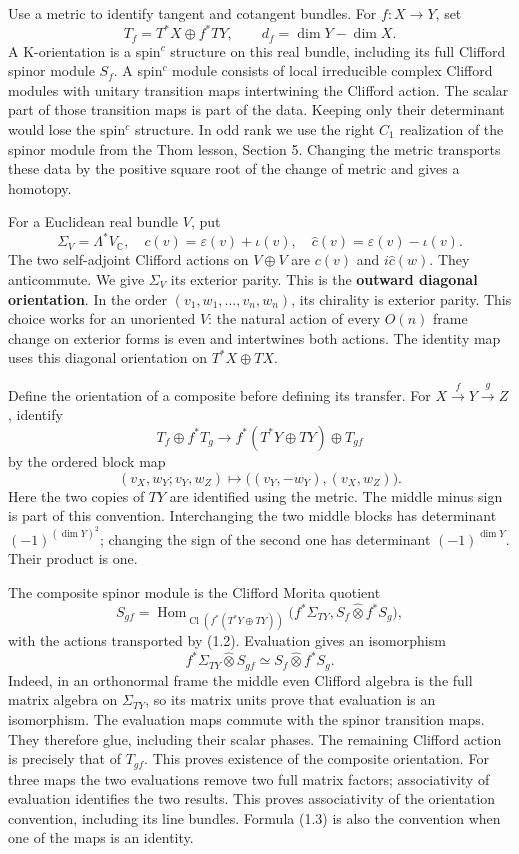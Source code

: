 \documentclass[
  11pt,
]{article}
\begin{document}
Use a metric to identify tangent and cotangent bundles. For
\(f:X\to Y\), set \[
 T_f=T^*X\oplus f^*TY,\qquad d_f=\dim Y-\dim X.
 \tag{1.1}
\] A K-orientation is a spin\(^{c}\) structure on this real bundle,
including its full Clifford spinor module \(S_f\). A spin\(^{c}\) module
consists of local irreducible complex Clifford modules with unitary
transition maps intertwining the Clifford action. The scalar part of
those transition maps is part of the data. Keeping only their
determinant would lose the spin\(^{c}\) structure. In odd rank we use
the right \(C_1\) realization of the spinor module from the Thom lesson,
Section 5. Changing the metric transports these data by the positive
square root of the change of metric and gives a homotopy.

For a Euclidean real bundle \(V\), put \[
 \Sigma_V=\Lambda^*V_{\mathbb C},\quad
 c(v)=\varepsilon(v)+\iota(v),\quad
 \widehat c(v)=\varepsilon(v)-\iota(v).
\] The two self-adjoint Clifford actions on \(V\oplus V\) are \(c(v)\)
and \(i\widehat c(w)\). They anticommute. We give \(\Sigma_V\) its
exterior parity. This is the \textbf{outward diagonal orientation}. In
the order \((v_1,w_1,\ldots,v_n,w_n)\), its chirality is exterior
parity. This choice works for an unoriented \(V\): the natural action of
every \(O(n)\) frame change on exterior forms is even and intertwines
both actions. The identity map uses this diagonal orientation on
\(T^*X\oplus TX\).

Define the orientation of a composite before defining its transfer. For
\(X\xrightarrow{f}Y\xrightarrow{g}Z\), identify \[
 T_f\oplus f^*T_g
 \longrightarrow f^*(T^*Y\oplus TY)\oplus T_{gf}
\] by the ordered block map \[
 (v_X,w_Y;v_Y,w_Z)\longmapsto
 \bigl((v_Y,-w_Y),(v_X,w_Z)\bigr).
 \tag{1.2}
\] Here the two copies of \(TY\) are identified using the metric. The
middle minus sign is part of this convention. Interchanging the two
middle blocks has determinant \((-1)^{(\dim Y)^2}\); changing the sign
of the second one has determinant \((-1)^{\dim Y}\). Their product is
one.

The composite spinor module is the Clifford Morita quotient \[
 S_{gf}=\operatorname{Hom}_{\operatorname{Cl}(f^*(T^*Y\oplus TY))}
 \bigl(f^*\Sigma_{TY},S_f\widehat\otimes f^*S_g\bigr),
 \tag{1.3}
\] with the actions transported by (1.2). Evaluation gives an
isomorphism \[
 f^*\Sigma_{TY}\widehat\otimes S_{gf}
 \simeq S_f\widehat\otimes f^*S_g.
 \tag{1.4}
\] Indeed, in an orthonormal frame the middle even Clifford algebra is
the full matrix algebra on \(\Sigma_{TY}\), so its matrix units prove
that evaluation is an isomorphism. The evaluation maps commute with the
spinor transition maps. They therefore glue, including their scalar
phases. The remaining Clifford action is precisely that of \(T_{gf}\).
This proves existence of the composite orientation. For three maps the
two evaluations remove two full matrix factors; associativity of
evaluation identifies the two results. This proves associativity of the
orientation convention, including its line bundles. Formula (1.3) is
also the convention when one of the maps is an identity.
\end{document}

